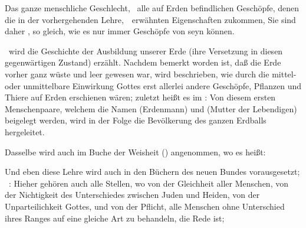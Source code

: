 Das ganze menschliche Geschlecht, \dh\ alle auf Erden befindlichen Geschöpfe, denen die in der vorhergehenden Lehre,~\ erwähnten Eigenschaften zukommen,  Sie sind daher , so gleich, wie es nur immer Geschöpfe von  seyn können.

\begin{aufza}
\item {}\ wird die Geschichte der Ausbildung unserer Erde (ihre Versetzung in diesen gegenwärtigen Zustand) erzählt. Nachdem bemerkt worden ist, daß die Erde vorher ganz wüste und leer gewesen war, wird beschrieben, wie durch die mittel- oder unmittelbare Einwirkung Gottes erst allerlei andere Geschöpfe, Pflanzen und Thiere auf Erden erschienen wären; zuletzt heißt es im :  Von diesem ersten Menschenpaare, welchem die Namen  (Erdenmann) und  (Mutter der Lebendigen) beigelegt werden, wird in der Folge die Bevölkerung des ganzen Erdballs hergeleitet.
\item Dasselbe wird auch im Buche der Weisheit () angenommen, wo es heißt: 
\item Und eben diese Lehre wird auch in den Büchern des neuen Bundes vorausgesetzt; \zB\ :  Hieher gehören auch alle Stellen, wo von der Gleichheit aller Menschen, von der Nichtigkeit des Unterschiedes zwischen Juden und Heiden, von der Unparteilichkeit Gottes, und von der Pflicht, alle Menschen ohne Unterschied ihres Ranges auf eine gleiche Art zu behandeln, die Rede ist; \zB\ \ \  \uam\ 
\end{aufza}

